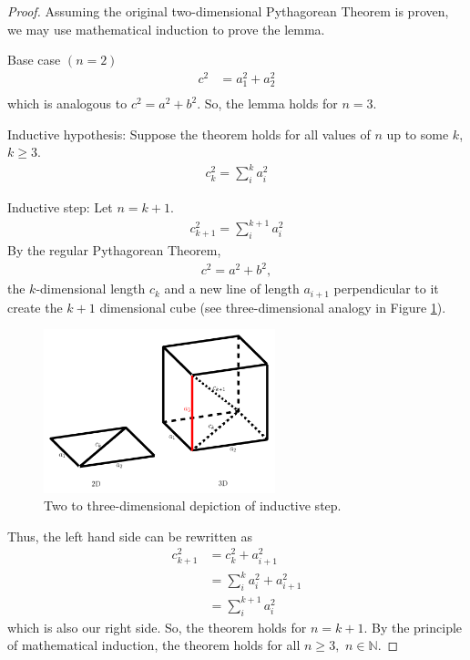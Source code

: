 \begin{proof}

    Assuming the original two-dimensional Pythagorean Theorem is proven, we may use mathematical induction to prove the lemma.
    
    \noindent 
    Base case $\left(n=2\right)$
    \begin{equation*}
        \begin{split}
            c^2&=a_1^2+a_2^2\\
        \end{split}
    \end{equation*}
    which is analogous to $c^2=a^2+b^2$. So, the lemma holds for $n=3$.
    
    \noindent Inductive hypothesis: Suppose the theorem holds for all values of $n$ up to some $k$, $k \geq 3$.
    \begin{equation*}
        \begin{split}
            c_k^2=\sum_{i}^{k}a_i^2
        \end{split}
    \end{equation*}
    
    \noindent Inductive step: Let $n=k+1$. 
    \begin{equation*}
        \begin{split}
        c_{k+1}^2=\sum_{i}^{k+1}a^2_{i}
        \end{split}
    \end{equation*}
    By the regular Pythagorean Theorem,
    \begin{align*}
        c^2=a^2+b^2,
    \end{align*}
    the $k$-dimensional length $c_k$ and a new line of length $a_{i+1}$ perpendicular to it create the $k+1$ dimensional cube (see three-dimensional analogy in Figure \ref{fig:induction}).
    
    \begin{figure}[h]
        \centering
        \includegraphics[width=0.6\textwidth]{images/induction.png}
        \caption{Two to three-dimensional depiction of inductive step.}
        \label{fig:induction}
    \end{figure}
    \noindent
    Thus, the left hand side can be rewritten as
    \begin{align*}
        c_{k+1}^2&=c_k^2+a_{i+1}^2\\
        &=\sum_{i}^{k}a_i^2+a_{i+1}^2\\
        &=\sum_{i}^{k+1}a^2_{i}
    \end{align*}
    which is also our right side. So, the theorem holds for $n=k+1$. 
    By the principle of mathematical induction, the theorem holds for all $n \geq 3,$ $n \in \mathbb{N}$.
\end{proof}

